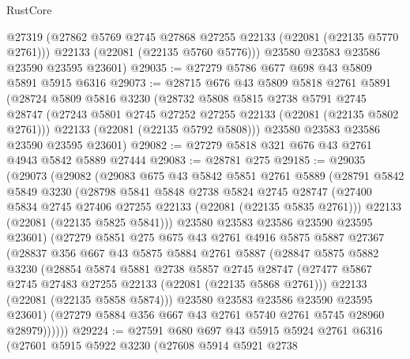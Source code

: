 \begin{lexlean}{RustCore}
\begin{coremodule}
        @27319
        (@27862 @5769 @2745 @27868 @27255 @22133 (@22081 (@22135 @5770 @2761)))
        @22133
        (@22081 (@22135 @5760 @5776)))
      @23580
      @23583
      @23586
      @23590
      @23595
      @23601)
@29035 := @27279 @5786 @677 @698 @43 @5809 @5891 @5915 @6316
@29073 := @28715
    @676
    @43
    @5809
    @5818
    @2761
    @5891
    (@28724
      @5809
      @5816
      @3230
      (@28732
        @5808
        @5815
        @2738
        @5791
        @2745
        @28747
        (@27243 @5801 @2745 @27252 @27255 @22133 (@22081 (@22135 @5802 @2761)))
        @22133
        (@22081 (@22135 @5792 @5808)))
      @23580
      @23583
      @23586
      @23590
      @23595
      @23601)
@29082 := @27279 @5818 @321 @676 @43 @2761 @4943 @5842 @5889 @27444
@29083 := @28781 @275
@29185 := @29035
    (@29073
      (@29082
        (@29083
          @675
          @43
          @5842
          @5851
          @2761
          @5889
          (@28791
            @5842
            @5849
            @3230
            (@28798
              @5841
              @5848
              @2738
              @5824
              @2745
              @28747
              (@27400 @5834 @2745 @27406 @27255 @22133 (@22081 (@22135 @5835 @2761)))
              @22133
              (@22081 (@22135 @5825 @5841)))
            @23580
            @23583
            @23586
            @23590
            @23595
            @23601)
          (@27279
            @5851
            @275
            @675
            @43
            @2761
            @4916
            @5875
            @5887
            @27367
            (@28837
              @356
              @667
              @43
              @5875
              @5884
              @2761
              @5887
              (@28847
                @5875
                @5882
                @3230
                (@28854
                  @5874
                  @5881
                  @2738
                  @5857
                  @2745
                  @28747
                  (@27477 @5867 @2745 @27483 @27255 @22133 (@22081 (@22135 @5868 @2761)))
                  @22133
                  (@22081 (@22135 @5858 @5874)))
                @23580
                @23583
                @23586
                @23590
                @23595
                @23601)
              (@27279 @5884 @356 @667 @43 @2761 @5740 @2761 @5745 @28960 @28979))))))
@29224 := @27591
    @680
    @697
    @43
    @5915
    @5924
    @2761
    @6316
    (@27601
      @5915
      @5922
      @3230
      (@27608
        @5914
        @5921
        @2738

\end{coremodule}
\end{lexlean}
